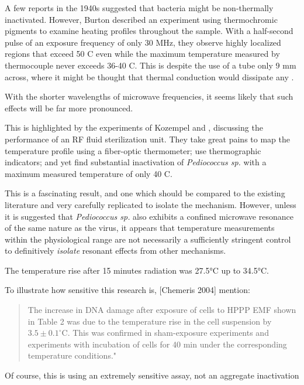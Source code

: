 \documentclass[paper.tex]{subfiles}
\begin{document}
\begin{multicols}{1}
A few reports in the 1940s suggested that bacteria might be non-thermally inactivated. However, Burton\cite{Effects1950} described an experiment using thermochromic pigments to examine heating profiles throughout the sample. With a half-second pulse of an exposure frequency of only 30 MHz, they observe highly localized regions that exceed 50 C even while the maximum temperature measured by thermocouple never exceeds 36-40 C. This is despite the use of a tube only 9 mm across, where it might be thought that thermal conduction would dissipate any . 

With the shorter wavelengths of microwave frequencies, it seems likely that such effects will be far more pronounced.

This is highlighted by the experiments of Kozempel \cite{Preliminary1997} and \cite{Inactivationa}, discussing the performance of an RF fluid sterilization unit. They take great pains to map the temperature profile using a fiber-optic thermometer; use thermographic indicators; and yet find substantial inactivation of {\it Pediococcus sp.} with a maximum measured temperature of only 40 C.

This is a fascinating result, and one which should be compared to the existing literature and very carefully replicated to isolate the mechanism. However, unless it is suggested that {\it Pediococcus sp.} also exhibits a confined microwave resonance of the same nature as the virus, it appears that temperature measurements within the physiological range are not necessarily a sufficiently stringent control to definitively {\it isolate} resonant effects from other mechanisms.


The temperature rise after 15 minutes radiation was 27.5°C up to 34.5°C.


To illustrate how sensitive this research is, [Chemeris 2004] mention:

\begin{quote}
	
	The increase in DNA damage after exposure of cells to HPPP EMF shown in Table 2 was due to the temperature rise in the cell suspension by $3.5\pm0.1^{\circ}  $C. This was confirmed in sham-exposure experiments and experiments with incubation of cells for 40 min under the corresponding temperature conditions."
	
\end{quote}

Of course, this is using an extremely sensitive assay, not an aggregate inactivation 


\end{multicols}
\end{document}
